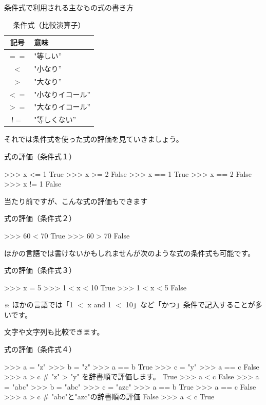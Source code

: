 \documentclass[11pt,a4paper,dvipdfmx,titlepage]{jsreport}
\begin{document}
\newpage 
条件式で利用される主なもの式の書き方
\begin{table}[h]
 \begin{center}
    \caption{条件式（比較演算子）}
\begin{tabular}{|c|p{4cm}|} 
\hline
記号 & 意味　\\ \hline \hline
 $ == $ & "等しい” \\ \hline
 $ < $ & "小なり” \\ \hline
 $ > $ & "大なり” \\ \hline
 $ <= $ & "小なりイコール” \\ \hline
 $ >= $ & "大なりイコール” \\ \hline
 $ != $ & "等しくない” \\ \hline
\end{tabular}
\end{center}
\end{table}


それでは条件式を使った式の評価を見ていきましょう。
\begin{grabox}{式の評価（条件式１）}
\begin{listingcont}
>>> x <= 1
True
>>> x >= 2
False
>>> x == 1
True
>>> x == 2
False
>>>  x != 1
False
\end{listingcont}
\end{grabox}

当たり前ですが、こんな式の評価もできます
\begin{grabox}{式の評価（条件式２）}
\begin{listingcont}
>>> 60 < 70
True
>>> 60 > 70
False
\end{listingcont}
\end{grabox}
ほかの言語では書けないかもしれませんが次のような式の条件式も可能です。
\begin{grabox}{{式の評価（条件式３）}}
\begin{listing}{1}
>>> x = 5
>>> 1 < x < 10
True
>>> 1 < x < 5
False
\end{listing}
\end{grabox}
※ ほかの言語では「1 $<$ x and 1 $<$ 10」など「かつ」条件で記入することが多いです。

文字や文字列も比較できます。
\begin{grabox}{{式の評価（条件式４）}}
\begin{listing}{1}
>>> a = "z"
>>> b = "z"
>>> a == b
True
>>> c = "y"
>>> a == c
False
>>> a > c # "z" > "y" を辞書順で評価します。
True
>>> a < c
False
>>> a = "abc"
>>> b = "abc"
>>> c = "azc"
>>> a == b
True
>>> a == c
False
>>> a > c # "abc"と"azc"の辞書順の評価
False
>>> a < c
True
\end{listing}
\end{grabox}
\end{document}
